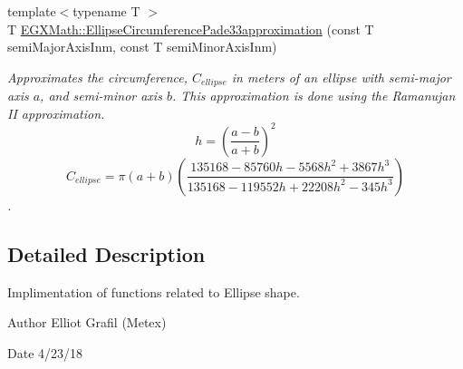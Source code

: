 \begin{DoxyCompactItemize}
{\footnotesize template$<$typename T $>$ }\\T \mbox{\hyperlink{group___e_g_x_math-_geometry-2_d-_ellipse-_circumference_ga0e0b290f1da2605c16ec13b9e221769d}{E\+G\+X\+Math\+::\+Ellipse\+Circumference\+Pade33approximation}} (const T semi\+Major\+Axis\+Inm, const T semi\+Minor\+Axis\+Inm)
\begin{DoxyCompactList}\small\item\em Approximates the circumference, $C_{ellipse}$ in meters of an ellipse with semi-\/major axis $a$, and semi-\/minor axis $b$. This approximation is done using the Ramanujan II approximation. \[ h=\left( \frac{a-b}{a+b} \right)^2 \] \[ C_{ellipse}=\pi (a + b) \left( \frac{135168-85760 h-5568 h^2+ 3867 h^3}{135168-119552 h+ 22208 h^2 - 345h^3} \right) \]. \end{DoxyCompactList}\end{DoxyCompactItemize}


\subsection{Detailed Description}
Implimentation of functions related to Ellipse shape. 

\begin{DoxyAuthor}{Author}
Elliot Grafil (Metex) 
\end{DoxyAuthor}
\begin{DoxyDate}{Date}
4/23/18 
\end{DoxyDate}
